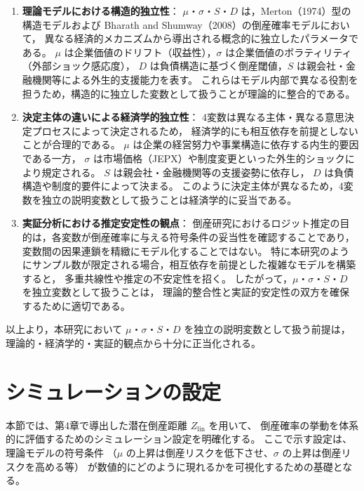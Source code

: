 \begin{enumerate}
    \item \textbf{理論モデルにおける構造的独立性}：  
    $\mu$・$\sigma$・$S$・$D$ は，Merton（1974）型の構造モデルおよび
    Bharath and Shumway（2008）の倒産確率モデルにおいて，
    異なる経済的メカニズムから導出される概念的に独立したパラメータである。
    $\mu$ は企業価値のドリフト（収益性），$\sigma$ は企業価値のボラティリティ（外部ショック感応度），
    $D$ は負債構造に基づく倒産閾値，$S$ は親会社・金融機関等による外生的支援能力を表す。
    これらはモデル内部で異なる役割を担うため，構造的に独立した変数として扱うことが理論的に整合的である。

    \item \textbf{決定主体の違いによる経済学的独立性}：  
    4変数は異なる主体・異なる意思決定プロセスによって決定されるため，
    経済学的にも相互依存を前提としないことが合理的である。
    $\mu$ は企業の経営努力や事業構造に依存する内生的要因である一方，
    $\sigma$ は市場価格（JEPX）や制度変更といった外生的ショックにより規定される。
    $S$ は親会社・金融機関等の支援姿勢に依存し，
    $D$ は負債構造や制度的要件によって決まる。
    このように決定主体が異なるため，4変数を独立の説明変数として扱うことは経済学的に妥当である。

    \item \textbf{実証分析における推定安定性の観点}：  
    倒産研究におけるロジット推定の目的は，各変数が倒産確率に与える符号条件の妥当性を確認することであり，
    変数間の因果連鎖を精緻にモデル化することではない。
    特に本研究のようにサンプル数が限定される場合，相互依存を前提とした複雑なモデルを構築すると，
    多重共線性や推定の不安定性を招く。
    したがって，$\mu$・$\sigma$・$S$・$D$ を独立変数として扱うことは，
    理論的整合性と実証的安定性の双方を確保するために適切である。
\end{enumerate}

以上より，本研究において $\mu$・$\sigma$・$S$・$D$ を独立の説明変数として扱う前提は，
理論的・経済学的・実証的観点から十分に正当化される。



\section{シミュレーションの設定}

本節では、第4章で導出した潜在倒産距離 $Z_{\text{lin}}$ を用いて、
倒産確率の挙動を体系的に評価するためのシミュレーション設定を明確化する。
ここで示す設定は、理論モデルの符号条件
（$\mu$ の上昇は倒産リスクを低下させ、$\sigma$ の上昇は倒産リスクを高める等）
が数値的にどのように現れるかを可視化するための基礎となる。

